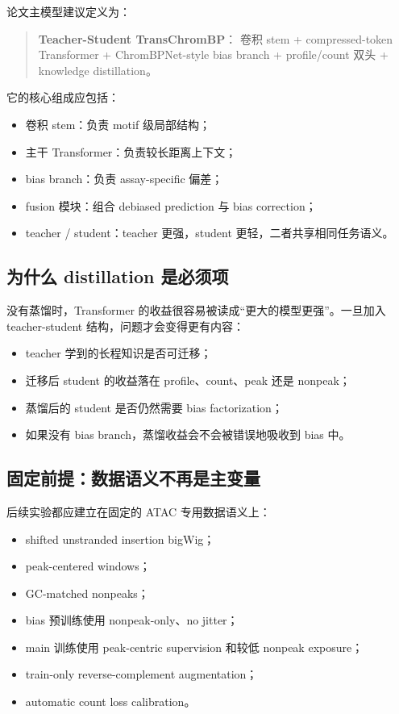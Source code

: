 \documentclass[11pt,a4paper]{ctexart}
\begin{document}
论文主模型建议定义为：
\begin{quote}
\textbf{Teacher-Student TransChromBP}：
卷积 stem + compressed-token Transformer + ChromBPNet-style bias branch +
profile/count 双头 + knowledge distillation。
\end{quote}

它的核心组成应包括：
\begin{itemize}[leftmargin=2em]
  \item 卷积 stem：负责 motif 级局部结构；
  \item 主干 Transformer：负责较长距离上下文；
  \item bias branch：负责 assay-specific 偏差；
  \item fusion 模块：组合 debiased prediction 与 bias correction；
  \item teacher / student：teacher 更强，student 更轻，二者共享相同任务语义。
\end{itemize}

\subsection{为什么 distillation 是必须项}

没有蒸馏时，Transformer 的收益很容易被读成“更大的模型更强”。一旦加入 teacher-student
结构，问题才会变得更有内容：
\begin{itemize}[leftmargin=2em]
  \item teacher 学到的长程知识是否可迁移；
  \item 迁移后 student 的收益落在 profile、count、peak 还是 nonpeak；
  \item 蒸馏后的 student 是否仍然需要 bias factorization；
  \item 如果没有 bias branch，蒸馏收益会不会被错误地吸收到 bias 中。
\end{itemize}

\subsection{固定前提：数据语义不再是主变量}

后续实验都应建立在固定的 ATAC 专用数据语义上：
\begin{itemize}[leftmargin=2em]
  \item shifted unstranded insertion bigWig；
  \item peak-centered windows；
  \item GC-matched nonpeaks；
  \item bias 预训练使用 nonpeak-only、no jitter；
  \item main 训练使用 peak-centric supervision 和较低 nonpeak exposure；
  \item train-only reverse-complement augmentation；
  \item automatic count loss calibration。
\end{itemize}
\end{document}
